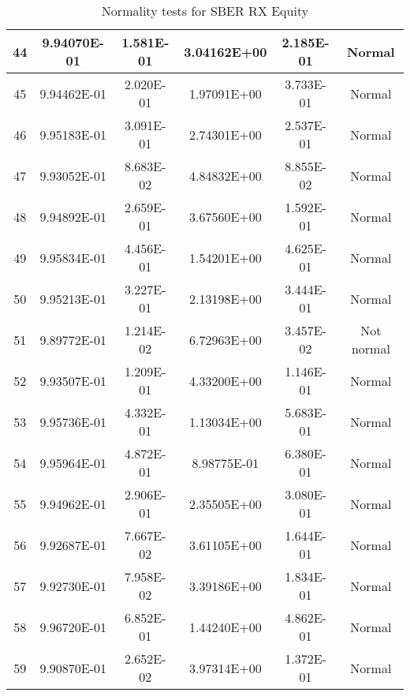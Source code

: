 \begin{table}[h]
\begin{tabular}{|c|c|c|c|c|c|}
		44 & 9.94070E-01 & 1.581E-01 & 3.04162E+00 & 2.185E-01 & Normal\\\hline
		45 & 9.94462E-01 & 2.020E-01 & 1.97091E+00 & 3.733E-01 & Normal\\\hline
		46 & 9.95183E-01 & 3.091E-01 & 2.74301E+00 & 2.537E-01 & Normal\\\hline
		47 & 9.93052E-01 & 8.683E-02 & 4.84832E+00 & 8.855E-02 & Normal\\\hline
		48 & 9.94892E-01 & 2.659E-01 & 3.67560E+00 & 1.592E-01 & Normal\\\hline
		49 & 9.95834E-01 & 4.456E-01 & 1.54201E+00 & 4.625E-01 & Normal\\\hline
		50 & 9.95213E-01 & 3.227E-01 & 2.13198E+00 & 3.444E-01 & Normal\\\hline
		51 & 9.89772E-01 & 1.214E-02 & 6.72963E+00 & 3.457E-02 & Not normal\\\hline
		52 & 9.93507E-01 & 1.209E-01 & 4.33200E+00 & 1.146E-01 & Normal\\\hline
		53 & 9.95736E-01 & 4.332E-01 & 1.13034E+00 & 5.683E-01 & Normal\\\hline
		54 & 9.95964E-01 & 4.872E-01 & 8.98775E-01 & 6.380E-01 & Normal\\\hline
		55 & 9.94962E-01 & 2.906E-01 & 2.35505E+00 & 3.080E-01 & Normal\\\hline
		56 & 9.92687E-01 & 7.667E-02 & 3.61105E+00 & 1.644E-01 & Normal\\\hline
		57 & 9.92730E-01 & 7.958E-02 & 3.39186E+00 & 1.834E-01 & Normal\\\hline
		58 & 9.96720E-01 & 6.852E-01 & 1.44240E+00 & 4.862E-01 & Normal\\\hline
		59 & 9.90870E-01 & 2.652E-02 & 3.97314E+00 & 1.372E-01 & Normal\\\hline
	\end{tabular}
	\caption{Normality tests for SBER RX Equity}
	\label{tab:normality_tests_SBER_RX}
\end{table}
